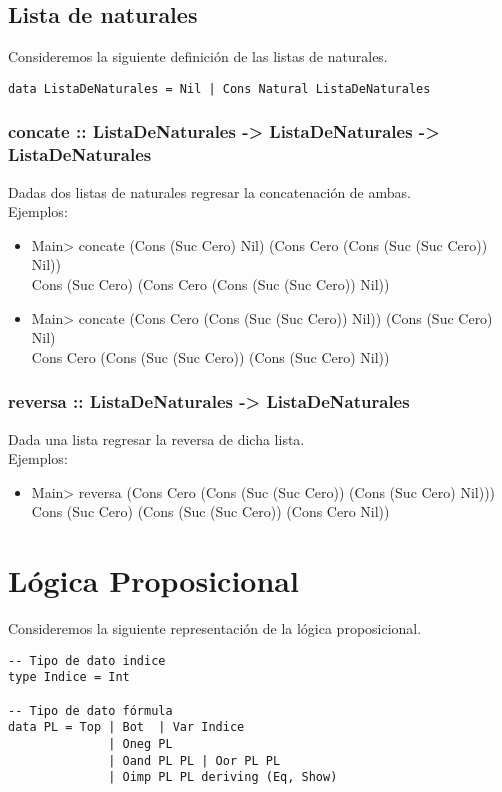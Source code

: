 \documentclass[11pt]{article}
\begin{document}
\subsection{Lista de naturales}
\label{sec:org6026b9a}
Consideremos la siguiente definición de las listas de naturales.
\begin{verbatim}
data ListaDeNaturales = Nil | Cons Natural ListaDeNaturales
\end{verbatim}
\subsubsection{concate :: ListaDeNaturales -> ListaDeNaturales -> ListaDeNaturales}
\label{sec:org230b4d5}
Dadas dos listas de naturales regresar la concatenación de ambas.\\
Ejemplos:
\begin{itemize}
\item Main> concate (Cons (Suc Cero) Nil) (Cons Cero (Cons (Suc (Suc Cero)) Nil))\\
Cons (Suc Cero) (Cons Cero (Cons (Suc (Suc Cero)) Nil))
\item Main> concate (Cons Cero (Cons (Suc (Suc Cero)) Nil)) (Cons (Suc Cero) Nil)\\
Cons Cero (Cons (Suc (Suc Cero)) (Cons (Suc Cero) Nil))
\end{itemize}
\subsubsection{reversa :: ListaDeNaturales -> ListaDeNaturales}
\label{sec:orgc3617cf}
Dada una lista regresar la reversa de dicha lista.\\
Ejemplos:
\begin{itemize}
\item Main> reversa (Cons Cero (Cons (Suc (Suc Cero)) (Cons (Suc Cero) Nil)))\\
Cons (Suc Cero) (Cons (Suc (Suc Cero)) (Cons Cero Nil))
\end{itemize}
\section{Lógica Proposicional}
\label{sec:org2b24091}
Consideremos la siguiente representación de la lógica proposicional.
\begin{verbatim}
-- Tipo de dato indice
type Indice = Int

-- Tipo de dato fórmula
data PL = Top | Bot  | Var Indice
              | Oneg PL 
              | Oand PL PL | Oor PL PL 
              | Oimp PL PL deriving (Eq, Show)
\end{verbatim}
\end{document}
